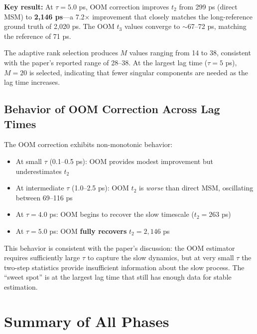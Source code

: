 \documentclass[11pt,a4paper]{article}
\begin{document}
\textbf{Key result:} At $\tau = 5.0$ ps, OOM correction improves $t_2$ from 299 ps (direct MSM) to \textbf{2{,}146 ps}---a 7.2$\times$ improvement that closely matches the long-reference ground truth of 2{,}020 ps. The OOM $t_3$ values converge to $\sim$67--72 ps, matching the reference of 71 ps.

The adaptive rank selection produces $M$ values ranging from 14 to 38, consistent with the paper's reported range of 28--38. At the largest lag time ($\tau = 5$ ps), $M = 20$ is selected, indicating that fewer singular components are needed as the lag time increases.

\subsection{Behavior of OOM Correction Across Lag Times}

The OOM correction exhibits non-monotonic behavior:
\begin{itemize}[nosep]
    \item At small $\tau$ (0.1--0.5 ps): OOM provides modest improvement but underestimates $t_2$
    \item At intermediate $\tau$ (1.0--2.5 ps): OOM $t_2$ is \textit{worse} than direct MSM, oscillating between 69--116 ps
    \item At $\tau = 4.0$ ps: OOM begins to recover the slow timescale ($t_2 = 263$ ps)
    \item At $\tau = 5.0$ ps: OOM \textbf{fully recovers} $t_2 = 2{,}146$ ps
\end{itemize}

This behavior is consistent with the paper's discussion: the OOM estimator requires sufficiently large $\tau$ to capture the slow dynamics, but at very small $\tau$ the two-step statistics provide insufficient information about the slow process. The ``sweet spot'' is at the largest lag time that still has enough data for stable estimation.

\section{Summary of All Phases}
\end{document}
